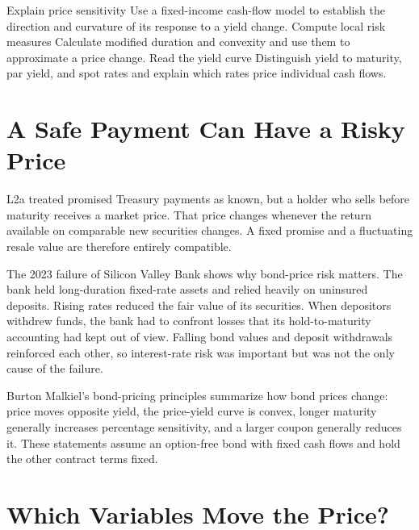 \documentclass[11pt]{article}
\begin{document}

\learningobjectives
  {Explain price sensitivity}
  {Use a fixed-income cash-flow model to establish the direction and curvature of its response to a yield change.}
  {Compute local risk measures}
  {Calculate modified duration and convexity and use them to approximate a price change.}
  {Read the yield curve}
  {Distinguish yield to maturity, par yield, and spot rates and explain which rates price individual cash flows.}

\section{A Safe Payment Can Have a Risky Price}

L2a treated promised Treasury payments as known, but a holder who sells before maturity receives a market price. That price changes whenever the return available on comparable new securities changes. A fixed promise and a fluctuating resale value are therefore entirely compatible.

The 2023 failure of Silicon Valley Bank shows why bond-price risk matters. The bank held long-duration fixed-rate assets and relied heavily on uninsured deposits. Rising rates reduced the fair value of its securities. When depositors withdrew funds, the bank had to confront losses that its hold-to-maturity accounting had kept out of view. Falling bond values and deposit withdrawals reinforced each other, so interest-rate risk was important but was not the only cause of the failure.

Burton Malkiel's bond-pricing principles summarize how bond prices change: price moves opposite yield, the price-yield curve is convex, longer maturity generally increases percentage sensitivity, and a larger coupon generally reduces it. These statements assume an option-free bond with fixed cash flows and hold the other contract terms fixed.

\section{Which Variables Move the Price?}
\end{document}
